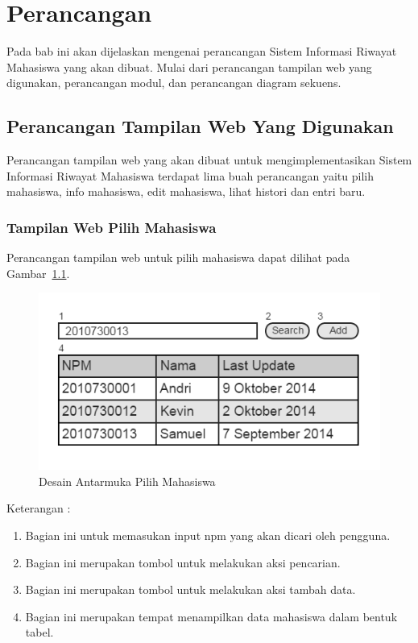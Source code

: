 \chapter{Perancangan}
\label{chap:perancangan}

Pada bab ini akan dijelaskan mengenai perancangan Sistem Informasi Riwayat Mahasiswa yang akan dibuat. Mulai dari perancangan tampilan web yang digunakan, perancangan modul, dan perancangan diagram sekuens.


\section{Perancangan Tampilan Web Yang Digunakan}
\label{sec:perancanganantarmuka}

Perancangan tampilan web yang akan dibuat untuk mengimplementasikan Sistem Informasi Riwayat Mahasiswa terdapat lima buah perancangan yaitu pilih mahasiswa, info mahasiswa, edit mahasiswa, lihat histori dan entri baru.

\subsection{Tampilan Web Pilih Mahasiswa}
Perancangan tampilan web untuk pilih mahasiswa dapat dilihat pada Gambar~\ref{fig:pilihmahasiswa}.

\begin{figure}[H]
\centering
\includegraphics[scale=0.5]{Gambar/pilihmahasiswa.png}
\caption[Desain Antarmuka Pilih Mahasiswa]{Desain Antarmuka Pilih Mahasiswa}
\label{fig:pilihmahasiswa}
\end{figure}

Keterangan :
\begin{enumerate}[(1)]
\item
Bagian ini untuk memasukan input npm yang akan dicari oleh pengguna.
\item
Bagian ini merupakan tombol untuk melakukan aksi pencarian.
\item
Bagian ini merupakan tombol untuk melakukan aksi tambah data.
\item
Bagian ini merupakan tempat menampilkan data mahasiswa dalam bentuk tabel.
\end{enumerate}

